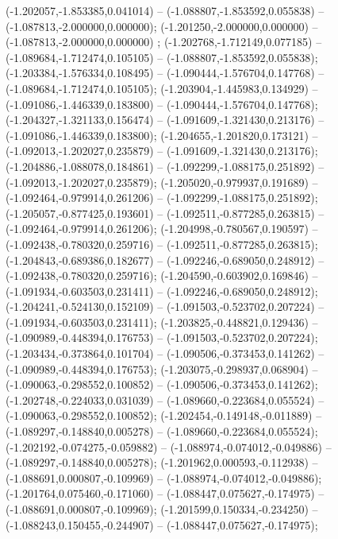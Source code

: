  (-1.202057,-1.853385,0.041014) -- (-1.088807,-1.853592,0.055838) -- (-1.087813,-2.000000,0.000000);
 (-1.201250,-2.000000,0.000000) -- (-1.087813,-2.000000,0.000000) ;
 (-1.202768,-1.712149,0.077185) -- (-1.089684,-1.712474,0.105105) -- (-1.088807,-1.853592,0.055838);
 (-1.203384,-1.576334,0.108495) -- (-1.090444,-1.576704,0.147768) -- (-1.089684,-1.712474,0.105105);
 (-1.203904,-1.445983,0.134929) -- (-1.091086,-1.446339,0.183800) -- (-1.090444,-1.576704,0.147768);
 (-1.204327,-1.321133,0.156474) -- (-1.091609,-1.321430,0.213176) -- (-1.091086,-1.446339,0.183800);
 (-1.204655,-1.201820,0.173121) -- (-1.092013,-1.202027,0.235879) -- (-1.091609,-1.321430,0.213176);
 (-1.204886,-1.088078,0.184861) -- (-1.092299,-1.088175,0.251892) -- (-1.092013,-1.202027,0.235879);
 (-1.205020,-0.979937,0.191689) -- (-1.092464,-0.979914,0.261206) -- (-1.092299,-1.088175,0.251892);
 (-1.205057,-0.877425,0.193601) -- (-1.092511,-0.877285,0.263815) -- (-1.092464,-0.979914,0.261206);
 (-1.204998,-0.780567,0.190597) -- (-1.092438,-0.780320,0.259716) -- (-1.092511,-0.877285,0.263815);
 (-1.204843,-0.689386,0.182677) -- (-1.092246,-0.689050,0.248912) -- (-1.092438,-0.780320,0.259716);
 (-1.204590,-0.603902,0.169846) -- (-1.091934,-0.603503,0.231411) -- (-1.092246,-0.689050,0.248912);
 (-1.204241,-0.524130,0.152109) -- (-1.091503,-0.523702,0.207224) -- (-1.091934,-0.603503,0.231411);
 (-1.203825,-0.448821,0.129436) -- (-1.090989,-0.448394,0.176753) -- (-1.091503,-0.523702,0.207224);
 (-1.203434,-0.373864,0.101704) -- (-1.090506,-0.373453,0.141262) -- (-1.090989,-0.448394,0.176753);
 (-1.203075,-0.298937,0.068904) -- (-1.090063,-0.298552,0.100852) -- (-1.090506,-0.373453,0.141262);
 (-1.202748,-0.224033,0.031039) -- (-1.089660,-0.223684,0.055524) -- (-1.090063,-0.298552,0.100852);
 (-1.202454,-0.149148,-0.011889) -- (-1.089297,-0.148840,0.005278) -- (-1.089660,-0.223684,0.055524);
 (-1.202192,-0.074275,-0.059882) -- (-1.088974,-0.074012,-0.049886) -- (-1.089297,-0.148840,0.005278);
 (-1.201962,0.000593,-0.112938) -- (-1.088691,0.000807,-0.109969) -- (-1.088974,-0.074012,-0.049886);
 (-1.201764,0.075460,-0.171060) -- (-1.088447,0.075627,-0.174975) -- (-1.088691,0.000807,-0.109969);
 (-1.201599,0.150334,-0.234250) -- (-1.088243,0.150455,-0.244907) -- (-1.088447,0.075627,-0.174975);
